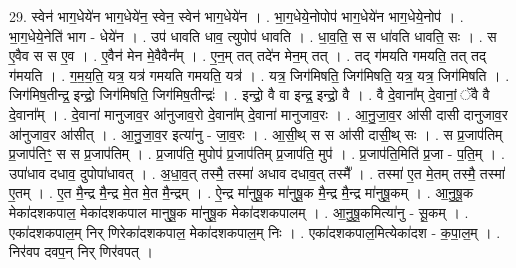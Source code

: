 \documentclass[17pt]{extarticle}
\begin{document}
29. स्वेन॑ भाग॒धेये॑न भाग॒धेये॑न॒ स्वेन॒ स्वेन॑ भाग॒धेये॑न । . भा॒ग॒धेये॒नोपोप॑ भाग॒धेये॑न भाग॒धेये॒नोप॑ । . भा॒ग॒धेये॒नेति॑ भाग - धेये॑न । . उप॑ धावति धाव॒ त्युपोप॑ धावति । . धा॒व॒ति॒ स स धा॑वति धावति॒ सः । . स ए॒वैव स स ए॒व । . ए॒वैन॑ मेन मे॒वैवैन᳚म् । . ए॒न॒म् तत् तदे॑न मेन॒म् तत् । . तद् ग॑मयति गमयति॒ तत् तद् ग॑मयति । . ग॒म॒य॒ति॒ यत्र॒ यत्र॑ गमयति गमयति॒ यत्र॑ । . यत्र॒ जिग॑मिषति॒ जिग॑मिषति॒ यत्र॒ यत्र॒ जिग॑मिषति । . जिग॑मिष॒तीन्द्र॒ इन्द्रो॒ जिग॑मिषति॒ जिग॑मिष॒तीन्द्रः॑ । . इन्द्रो॒ वै वा इन्द्र॒ इन्द्रो॒ वै । . वै दे॒वाना᳚म् दे॒वानां॒ ॅवै वै दे॒वाना᳚म् । . दे॒वाना॑ मानुजाव॒र आ॑नुजाव॒रो दे॒वाना᳚म् दे॒वाना॑ मानुजाव॒रः । . आ॒नु॒जा॒व॒र आ॑सी दासी दानुजाव॒र आ॑नुजाव॒र आ॑सीत् । . आ॒नु॒जा॒व॒र इत्या॑नु - जा॒व॒रः । . आ॒सी॒थ् स स आ॑सी दासी॒थ् सः । . स प्र॒जाप॑तिम् प्र॒जाप॑तिꣳ॒॒ स स प्र॒जाप॑तिम् । . प्र॒जाप॑ति॒ मुपोप॑ प्र॒जाप॑तिम् प्र॒जाप॑ति॒ मुप॑ । . प्र॒जाप॑ति॒मिति॑ प्र॒जा - प॒ति॒म् । . उपा॑धाव दधाव॒ दुपोपा॑धावत् । . अ॒धा॒व॒त् तस्मै॒ तस्मा॑ अधाव दधाव॒त् तस्मै᳚ । . तस्मा॑ ए॒त मे॒तम् तस्मै॒ तस्मा॑ ए॒तम् । . ए॒त मै॒न्द्र मै॒न्द्र मे॒त मे॒त मै॒न्द्रम् । . ऐ॒न्द्र मा॑नुषू॒क मा॑नुषू॒क मै॒न्द्र मै॒न्द्र मा॑नुषू॒कम् । . आ॒नु॒षू॒क मेका॑दशकपाल॒ मेका॑दशकपाल मानुषू॒क मा॑नुषू॒क मेका॑दशकपालम् । . आ॒नु॒षू॒कमित्या॑नु - सू॒कम् । . एका॑दशकपाल॒म् निर् णिरेका॑दशकपाल॒ मेका॑दशकपाल॒म् निः । . एका॑दशकपाल॒मित्येका॑दश - क॒पा॒ल॒म् । . निर॑वप दवप॒न् निर् णिर॑वपत् । \newline
\end{document}
